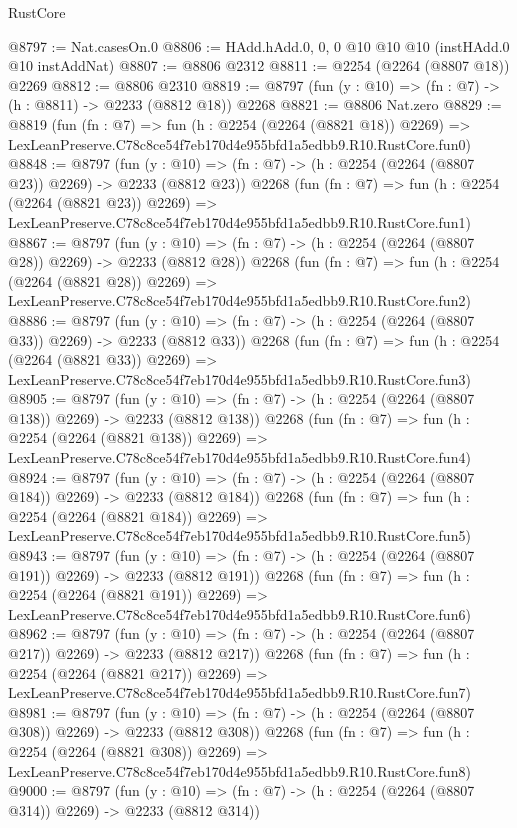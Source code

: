 \begin{lexlean}{RustCore}
\begin{coremodule}
@8797 := Nat.casesOn.{0}
@8806 := HAdd.hAdd.{0, 0, 0} @10 @10 @10 (instHAdd.{0} @10 instAddNat)
@8807 := @8806 @2312
@8811 := @2254 (@2264 (@8807 @18)) @2269
@8812 := @8806 @2310
@8819 := @8797 (fun (y : @10) => (fn : @7) -> (h : @8811) -> @2233 (@8812 @18)) @2268
@8821 := @8806 Nat.zero
@8829 := @8819
    (fun (fn : @7) =>
    fun (h : @2254 (@2264 (@8821 @18)) @2269) =>
    LexLeanPreserve.C78c8ce54f7eb170d4e955bfd1a5edbb9.R10.RustCore.fun0)
@8848 := @8797
    (fun (y : @10) => (fn : @7) -> (h : @2254 (@2264 (@8807 @23)) @2269) -> @2233 (@8812 @23))
    @2268
    (fun (fn : @7) =>
    fun (h : @2254 (@2264 (@8821 @23)) @2269) =>
    LexLeanPreserve.C78c8ce54f7eb170d4e955bfd1a5edbb9.R10.RustCore.fun1)
@8867 := @8797
    (fun (y : @10) => (fn : @7) -> (h : @2254 (@2264 (@8807 @28)) @2269) -> @2233 (@8812 @28))
    @2268
    (fun (fn : @7) =>
    fun (h : @2254 (@2264 (@8821 @28)) @2269) =>
    LexLeanPreserve.C78c8ce54f7eb170d4e955bfd1a5edbb9.R10.RustCore.fun2)
@8886 := @8797
    (fun (y : @10) => (fn : @7) -> (h : @2254 (@2264 (@8807 @33)) @2269) -> @2233 (@8812 @33))
    @2268
    (fun (fn : @7) =>
    fun (h : @2254 (@2264 (@8821 @33)) @2269) =>
    LexLeanPreserve.C78c8ce54f7eb170d4e955bfd1a5edbb9.R10.RustCore.fun3)
@8905 := @8797
    (fun (y : @10) => (fn : @7) -> (h : @2254 (@2264 (@8807 @138)) @2269) -> @2233 (@8812 @138))
    @2268
    (fun (fn : @7) =>
    fun (h : @2254 (@2264 (@8821 @138)) @2269) =>
    LexLeanPreserve.C78c8ce54f7eb170d4e955bfd1a5edbb9.R10.RustCore.fun4)
@8924 := @8797
    (fun (y : @10) => (fn : @7) -> (h : @2254 (@2264 (@8807 @184)) @2269) -> @2233 (@8812 @184))
    @2268
    (fun (fn : @7) =>
    fun (h : @2254 (@2264 (@8821 @184)) @2269) =>
    LexLeanPreserve.C78c8ce54f7eb170d4e955bfd1a5edbb9.R10.RustCore.fun5)
@8943 := @8797
    (fun (y : @10) => (fn : @7) -> (h : @2254 (@2264 (@8807 @191)) @2269) -> @2233 (@8812 @191))
    @2268
    (fun (fn : @7) =>
    fun (h : @2254 (@2264 (@8821 @191)) @2269) =>
    LexLeanPreserve.C78c8ce54f7eb170d4e955bfd1a5edbb9.R10.RustCore.fun6)
@8962 := @8797
    (fun (y : @10) => (fn : @7) -> (h : @2254 (@2264 (@8807 @217)) @2269) -> @2233 (@8812 @217))
    @2268
    (fun (fn : @7) =>
    fun (h : @2254 (@2264 (@8821 @217)) @2269) =>
    LexLeanPreserve.C78c8ce54f7eb170d4e955bfd1a5edbb9.R10.RustCore.fun7)
@8981 := @8797
    (fun (y : @10) => (fn : @7) -> (h : @2254 (@2264 (@8807 @308)) @2269) -> @2233 (@8812 @308))
    @2268
    (fun (fn : @7) =>
    fun (h : @2254 (@2264 (@8821 @308)) @2269) =>
    LexLeanPreserve.C78c8ce54f7eb170d4e955bfd1a5edbb9.R10.RustCore.fun8)
@9000 := @8797
    (fun (y : @10) => (fn : @7) -> (h : @2254 (@2264 (@8807 @314)) @2269) -> @2233 (@8812 @314))

\end{coremodule}
\end{lexlean}
